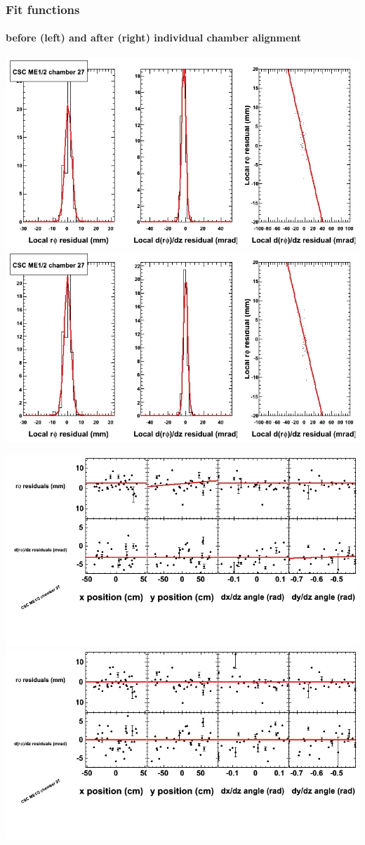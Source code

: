 \documentclass[compress]{beamer}
\begin{document}
\begin{frame}
\frametitle{Fit functions}
\framesubtitle{before (left) and after (right) individual chamber alignment}
\includegraphics[width=0.5\linewidth]{ringfits_3dof/beforefit_MEp12_27_bellcurve.png} \includegraphics[width=0.5\linewidth]{ringfits_3dof/afterfit_MEp12_27_bellcurve.png}

\includegraphics[width=0.5\linewidth]{ringfits_3dof/beforefit_MEp12_27_polynomials.png} \includegraphics[width=0.5\linewidth]{ringfits_3dof/afterfit_MEp12_27_polynomials.png}
\end{frame}
\end{document}
